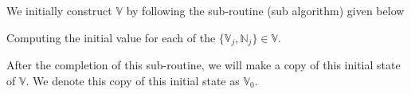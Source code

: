 \documentclass[../ClusteringConnectionsMAIN.tex]{subfiles}
\begin{document}
\begin{flushleft}
\begin{large}


We initially construct $\mathbb{V}$ by following the sub-routine (sub algorithm) given below

\begin{algorithm}
\caption{Computing the initial value for each of the $\bigl\{ \mathbb{V}_j, \mathbb{N}_j \bigr\} \in \mathbb{V}$.}
\end{algorithm}

After the completion of this sub-routine, we will make a copy of this initial state of $\mathbb{V}$.  We denote this copy of this initial state as $\mathbb{V}_0$.








































\end{large}
\end{flushleft}
\end{document}
